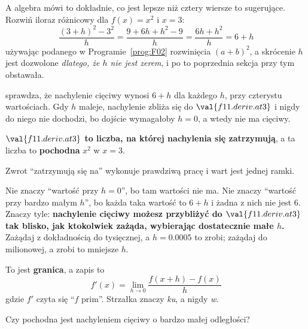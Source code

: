 \begin{fr}
A algebra mówi to dokładnie, co jest lepsze niż cztery wiersze to sugerujące.
Rozwiń iloraz różnicowy dla $f(x) = x^{2}$ i $x = 3$:
\[ \frac{(3+h)^{2} - 3^{2}}{h} = \frac{9 + 6h + h^{2} - 9}{h}
   = \frac{6h + h^{2}}{h} = 6 + h \]
używając podanego w Programie~\ref{prog:F02} rozwinięcia $(a+b)^{2}$, a
skrócenie $h$
jest dozwolone \emph{dlatego, że $h$ nie jest zerem}, i po to poprzednia
sekcja przy tym obstawała.

 sprawdza, że nachylenie cięciwy wynosi
$6 + h$ dla każdego $h$, przy czterystu wartościach. Gdy $h$ maleje,
nachylenie zbliża się do $\val{f11.deriv.at3}$ i nigdy do niego nie dochodzi,
bo dojście wymagałoby $h = 0$, a wtedy nie ma cięciwy.

\textbf{$\val{f11.deriv.at3}$ to liczba, na której nachylenia się zatrzymują},
a ta liczba to \textbf{pochodna} $x^{2}$ w $x = 3$.
\end{fr}

\begin{fr}
Zwrot \enquote{zatrzymują się na} wykonuje prawdziwą pracę i wart jest jednej
ramki.

Nie znaczy \enquote{wartość przy $h = 0$}, bo tam wartości nie ma. Nie znaczy
\enquote{wartość przy bardzo małym $h$}, bo każda taka wartość to $6 + h$ i
żadna z nich nie jest $6$. Znaczy tyle: \textbf{nachylenie cięciwy możesz
przybliżyć do $\val{f11.deriv.at3}$ tak blisko, jak ktokolwiek zażąda, wybierając
dostatecznie małe $h$.} Zażądaj z dokładnością do tysięcznej, a $h =
\num{0.0005}$ to zrobi; zażądaj do milionowej, a zrobi to mniejsze $h$.

To jest \textbf{granica}, a zapis to
\[ f'(x) = \lim_{h \to 0} \frac{f(x + h) - f(x)}{h} \]
gdzie $f'$ czyta się \enquote{$f$ prim}. Strzałka znaczy \emph{ku}, a nigdy
\emph{w}.

Czy pochodna jest nachyleniem cięciwy o bardzo małej odległości?
\nextframe
\end{fr}

